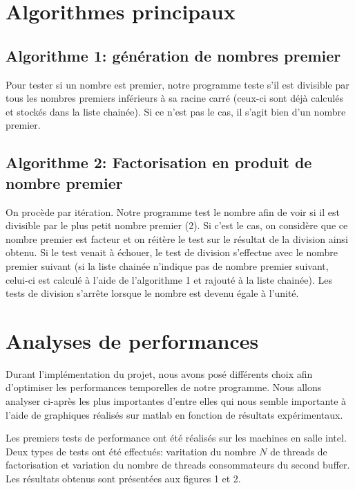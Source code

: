 \documentclass[11pt,a4paper]{article}
\begin{document}
\section*{Algorithmes principaux}
 \subsection*{Algorithme 1: génération de nombres premier}
 
Pour tester si un nombre est premier, notre programme teste s'il est divisible par tous les nombres premiers inférieurs à sa racine carré (ceux-ci sont déjà calculés et stockés dans la liste chainée). Si ce n'est pas le cas, il s'agit bien d'un nombre premier. 
 
 
 \subsection*{Algorithme 2: Factorisation en produit de nombre premier}   
 
 On procède par itération. Notre programme test le nombre afin de voir si il est divisible par le plus petit nombre premier (2). Si c'est le cas, on considère que ce nombre premier est facteur et on réitère le test sur le résultat de la division ainsi obtenu. Si le test venait à échouer, le test de division s'effectue avec le nombre premier suivant (si la liste chainée n'indique pas de nombre premier suivant, celui-ci est calculé à l'aide de l'algorithme 1 et rajouté à la liste chainée). Les tests de division s'arrête lorsque le nombre est devenu égale à l'unité.
 
\section*{Analyses de performances}

Durant l'implémentation du projet, nous avons posé différents choix afin d'optimiser les performances temporelles de notre programme. Nous allons analyser ci-après les plus importantes d'entre elles qui nous semble importante à l'aide de graphiques réalisés sur matlab en fonction de résultats expérimentaux.

Les premiers tests de performance ont été réalisés sur les machines en salle intel. Deux types de tests ont été effectués: varitation du nombre $N$ de threads de factorisation et variation du nombre de threads consommateurs du second buffer. Les résultats obtenus sont présentées aux figures 1 et 2.
\end{document}
